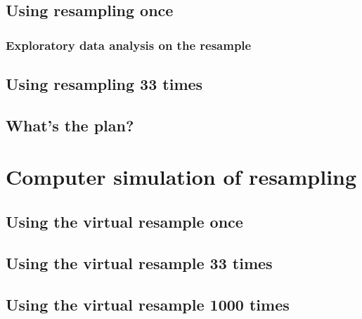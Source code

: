 \documentclass[12pt, krantz2,]{krantz}
\begin{document}
\hypertarget{using-resampling-once}{%
\subsection{Using resampling once}\label{using-resampling-once}}

\hypertarget{exploratory-data-analysis-on-the-resample}{%
\subsubsection*{Exploratory data analysis on the resample}\label{exploratory-data-analysis-on-the-resample}}


\hypertarget{student-resamples}{%
\subsection{Using resampling 33 times}\label{student-resamples}}

\hypertarget{whats-the-plan}{%
\subsection{What's the plan?}\label{whats-the-plan}}

\hypertarget{resampling-simulation}{%
\section{Computer simulation of resampling}\label{resampling-simulation}}

\hypertarget{using-the-virtual-resample-once}{%
\subsection{Using the virtual resample once}\label{using-the-virtual-resample-once}}

\hypertarget{using-the-virtual-resample-33-times}{%
\subsection{Using the virtual resample 33 times}\label{using-the-virtual-resample-33-times}}

\hypertarget{using-the-virtual-resample-1000-times}{%
\subsection{Using the virtual resample 1000 times}\label{using-the-virtual-resample-1000-times}}
\end{document}
